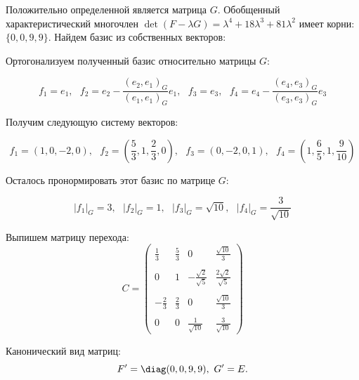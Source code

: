 \documentclass[a4paper]{article}
\begin{document}
\begin{solution}
Положительно определенной является матрица $G$. Обобщенный характеристический многочлен $\det(F-\lambda G)=\lambda^4+18\lambda^3+81\lambda^2$ имеет корни: $\{0, 0, 9, 9\}$. Найдем базис из собственных векторов:


Ортогонализуем полученный базис относительно матрицы $G$:

$$f_1=e_1, ~~~ f_2=e_2-\frac{\left(e_2,e_1\right)_G}{\left(e_1,e_1\right)_G}e_1, ~~~ f_3=e_3, ~~~ f_4=e_4-\frac{\left(e_4,e_3\right)_G}{\left(e_3,e_3\right)_G}e_3$$

Получим следующую систему векторов:

$$f_1=(1,0,-2,0), ~~~ f_2=\left(\frac{5}{3},1,\frac{2}{3},0\right), ~~~ f_3=\left(0,-2,0,1\right), ~~~ f_4=\left(1,\frac{6}{5},1,\frac{9}{10}\right)$$

Осталось пронормировать этот базис по матрице $G$:

$$\left|f_1\right|_G=3, ~~~ \left|f_2\right|_G=1, ~~~ \left|f_3\right|_G=\sqrt{10}, ~~~ \left|f_4\right|_G=\frac{3}{\sqrt{10}}$$

Выпишем матрицу перехода:
$$C=\begin{pmatrix}
\frac{1}{3}         & \frac{5}{3} & 0                       & \frac{\sqrt{10}}{3} \\
& & & \\
0                   & 1           & -\frac{\sqrt{2}}{\sqrt{5}}   & \frac{2\sqrt{2}}{\sqrt{5}} \\
& & & \\
-\frac{2}{3}         & \frac{2}{3} & 0                       & \frac{\sqrt{10}}{3} \\
& & & \\
0                   & 0           & \frac{1}{\sqrt{10}}  & \frac{3}{\sqrt{10}}
\end{pmatrix}
$$

Канонический вид матриц: $$F^\prime=\diag(0,0,9,9), ~ G^\prime=E.$$
\end{solution}
\end{document}
